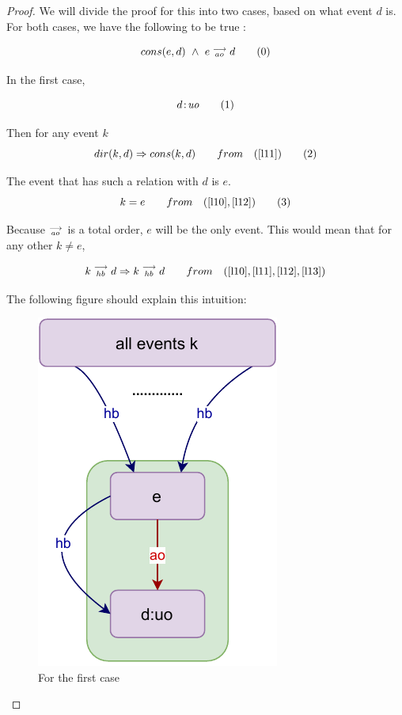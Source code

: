     \begin{proof}
        
        We will divide the proof for this into two cases, based on what event $d$ is. For both cases, we have the following to be true :
        
        \[
            cons(e,d) \ \wedge \ e\stackrel{\longrightarrow}{_{ao}}d
            \tag{0}
            \label{l10}
        \]
    
        In the first case, 
        
        \[
            d\!:\!\textit{uo} 
            \tag{1}
            \label{l11}
        \]
        
        Then for any event $k$
        \[
            dir(k,d) \Rightarrow cons(k,d)
            \qquad from \quad
            (\ref{l11})
            \tag{2}
            \label{l12}
        \]
        
        The event that has such a relation with $d$ is $e$.
        \[
             k = e  
             \qquad from \quad
             (\ref{l10}, \ref{l12})
             \tag{3}
             \label{l13}
        \]
        
        Because $\stackrel{\longrightarrow}{_{ao}}$ is a total order, $e$ will be the only event. This would mean that for any other $k \neq e$,
        
        \[
            k\stackrel{\longrightarrow}{_{hb}}d \Rightarrow k\stackrel{\longrightarrow}{_{hb}}d
            \qquad from \quad
            (\ref{l10}, \ref{l11}, \ref{l12}, \ref{l13}) 
        \]
        
        The following figure should explain this intuition:  
        \begin{figure}[H]
            \centering
            \includegraphics[scale=0.7]{Lemma_Proof1_Case1.pdf}
            \caption{For the first case}
            \label{fig:my_label}
        \end{figure}
        

\end{proof}
